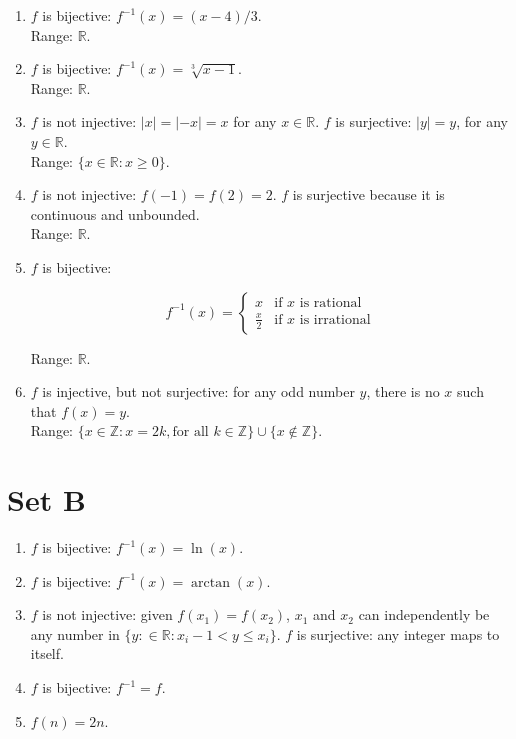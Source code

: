 \documentclass{article}
\begin{document}
\begin{enumerate}
    \item $f$ is bijective: $f^{-1}(x) = (x - 4)/3$.\\ Range: $\mathbb{R}$.

    \item $f$ is bijective: $f^{-1}(x) = \sqrt[3]{x - 1}$.\\ Range: $\mathbb{R}$.

    \item $f$ is not injective: $|x| = |-x| = x$ for any $x \in \mathbb{R}$. $f$ is surjective: $|y| = y$, for any $y \in \mathbb{R}$.\\ Range: $\{x \in \mathbb{R}: x \geqslant 0\}$.

    \item $f$ is not injective: $f(-1) = f(2) = 2$. $f$ is surjective because it is continuous and unbounded.\\ Range: $\mathbb{R}$.

    \item $f$ is bijective: 
        
       \[
        f^{-1}(x) = 
            \begin{cases}
                x & \text{if $x$ is rational} \\
                \frac{x}{2} & \text{if $x$ is irrational}
            \end{cases}
        \]

      Range: $\mathbb{R}$.

    \item $f$ is injective, but not surjective: for any odd number $y$, there is no $x$ such that $f(x) = y$.\\ Range: $\{x \in \mathbb{Z}: x = 2k, \text{for all $k \in \mathbb{Z}$}\} \cup \{x \notin \mathbb{Z}\}$.
\end{enumerate}


\section{Set B}
\begin{enumerate}
    \item $f$ is bijective: $f^{-1}(x) = \ln(x)$.

    \item $f$ is bijective: $f^{-1}(x) = \arctan(x)$.

    \item $f$ is not injective: given $f(x_1) = f(x_2)$, $x_1$ and $x_2$ can independently be any number in $\{y: \in \mathbb{R}: x_i - 1 < y \leqslant x_i\}$. $f$ is surjective: any integer maps to itself.

    \item $f$ is bijective: $f^{-1} = f$.

    \item $f(n) = 2n$.
\end{enumerate}
\end{document}
